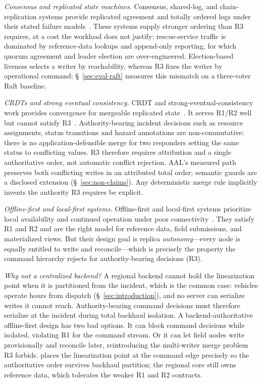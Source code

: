 \textit{Consensus and replicated state machines.} Consensus, shared-log, and
chain-replication systems provide replicated agreement and totally ordered logs
under their stated failure
models~\cite{lamport1998parttime,ongaro2014raft,balakrishnan2013tango,vanrenesse2004chain}.
These systems supply stronger ordering than R3 requires, at a cost the workload
does not justify: rescue-service traffic is dominated by reference-data lookups
and append-only reporting, for which quorum agreement and leader election are
over-engineered. Election-based liveness selects a writer by reachability, whereas
R3 fixes the writer by operational command; \S~\ref{sec:eval-raft} measures this
mismatch on a three-voter Raft baseline.

\textit{CRDTs and strong eventual consistency.} CRDT and strong-eventual-consistency work provides convergence for mergeable
replicated state~\cite{almeida2014delta,hanssen2025emergency,almeida2024crdtsurvey}.
It serves R1/R2 well but cannot satisfy R3~\cite{mao2024reliablecrdt}.
Authority-bearing incident decisions such as resource assignments, status
transitions and hazard annotations are non-commutative: there is no
application-defensible merge for two responders setting the same status to
conflicting values. R3 therefore requires attribution and a single authoritative
order, not automatic conflict rejection. AAL's measured path preserves both
conflicting writes in an attributed total order; semantic guards are a disclosed
extension (\S~\ref{sec:non-claims}). Any deterministic merge rule implicitly
invents the authority R3 requires be explicit.

\textit{Offline-first and local-first systems.} Offline-first and local-first
systems prioritize local availability and continued operation under poor
connectivity~\cite{kleppmann2019localfirst,richardson2018microservices}.
They satisfy R1 and R2 and are the right model for reference data, field
submissions, and materialized views. But their design goal is replica
\emph{autonomy}---every node is equally entitled to write and reconcile---which
is precisely the property the command hierarchy rejects for authority-bearing
decisions (R3).

\textit{Why not a centralized backend?} A regional backend cannot hold the
linearization point when it is partitioned from the incident, which is the
common case: vehicles operate hours from dispatch (\S~\ref{sec:introduction}),
and no server can serialize writes it cannot reach. Authority-bearing command
decisions must therefore serialize at the incident during total backhaul
isolation. A backend-authoritative offline-first design has two bad
options. It can block command decisions while isolated, violating R1 for the
command stream. Or it can let field nodes write provisionally and reconcile later,
reintroducing the multi-writer merge problem R3 forbids. \systemname{} places the linearization point at the
command edge precisely so the authoritative order survives backhaul partition;
the regional core still owns reference data, which tolerates the weaker R1 and
R2 contracts.

